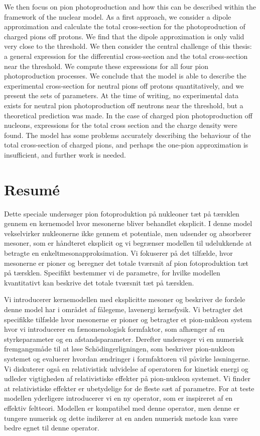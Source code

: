 We then focus on pion photoproduction and how this can be described within the framework of the nuclear model. As a first approach, we consider a dipole approximation and calculate the total cross-section for the photoproduction of charged pions off protons. We find that the dipole approximation is only valid very close to the threshold. We then consider the central challenge of this thesis: a general expression for the differential cross-section and the total cross-section near the threshold. We compute these expressions for all four pion photoproduction processes. We conclude that the model is able to describe the experimental cross-section for neutral pions off protons quantitatively, and we present the sets of parameters. At the time of writing, no experimental data exists for neutral pion photoproduction off neutrons near the threshold, but a theoretical prediction was made. In the case of charged pion photoproduction off nucleons, expressions for the total cross section and the charge density were found. The model has some problems accurately describing the behaviour of the total cross-section of charged pions, and perhaps the one-pion approximation is insufficient, and further work is needed.

\newpage
\section*{Resumé}
Dette speciale undersøger pion fotoproduktion på nukleoner tæt på tærsklen gennem en kernemodel hvor mesonerne bliver behandlet eksplicit. I denne model vekselvirker nukleonerne ikke gennem et potentiale, men udsender og absorberer mesoner, som er håndteret eksplicit og vi begrænser modellen til udelukkende at betragte en enkeltmesonapproksimation. Vi fokuserer på det tilfælde, hvor mesonerne er pioner og beregner det totale tværsnit af pion fotoproduktion tæt på tærsklen. Specifikt bestemmer vi de parametre, for hvilke modellen kvantitativt kan beskrive det totale tværsnit tæt på tærsklen. 

Vi introducerer kernemodellen med eksplicitte mesoner og beskriver de fordele denne model har i området af fålegeme, lavenergi kernefysik. Vi betragter det specifikke tilfælde hvor mesonerne er pioner og betragter et pion-nukleon system hvor vi introducerer en  fænomenologisk formfaktor, som afhænger af en styrkeparameter og en afstandsparameter. Derefter undersøger vi en numerisk fremgangsmåde til at løse Schödingerligningen, som beskriver pion-nukleon systemet og evaluerer hvordan  ændringer i formfaktoren vil påvirke løsningerne. Vi diskuterer også en relativistisk udvidelse af operatoren for kinetisk energi og udleder vigtigheden af relativistiske effekter på pion-nukleon systemet. Vi finder at relativistiske effekter er ubetydelige for de fleste sæt af parametre. For at teste modellen yderligere introducerer vi en ny operator, som er inspireret af en effektiv feltteori. Modellen er kompatibel med denne operator, men denne er tungere numerisk og dette indikerer at en anden numerisk metode kan være bedre egnet til denne operator.

